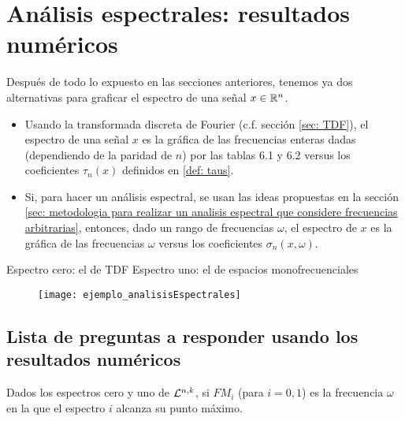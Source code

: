 \chapter{Análisis espectrales: resultados numéricos}
\label{chap: resultados numericos analisis espectrales}

Después de todo lo expuesto en las secciones anteriores, tenemos
ya dos alternativas para graficar el espectro
de una señal $x \in \mathbb{R}^{n}$.

\begin{itemize}
	\item Usando la transformada discreta de Fourier
	(c.f. sección \ref{sec: TDF}), el espectro de
	una señal $x$ es la gráfica de las frecuencias
	enteras dadas (dependiendo de la 
	paridad de $n$) por las
	tablas 6.1 y 6.2
	versus los coeficientes
	$\tau_{n}(x)$ definidos en
	\ref{def: taus}.
	
	\item Si, para hacer un análisis espectral, se usan
	las ideas propuestas en 
	la sección
	\ref{sec: metodologia para realizar un analisis espectral que considere frecuencias arbitrarias}, entonces, dado un rango de frecuencias 
	$\omega$,
	el espectro de $x$ es la gráfica de 
	las frecuencias $\omega$ versus	
	los coeficientes
	$\sigma_{n}(x, \omega)$.
	

\end{itemize}

Espectro cero: el de TDF
Espectro uno: el de espacios monofrecuenciales

\begin{figure}[H]
	\centering
	\texttt{[image: ejemplo\_analisisEspectrales]} 
\end{figure}	

\section{Lista de preguntas a responder usando los resultados numéricos}

\begin{notacion}
Dados los espectros cero y uno de $\mathcal{L}^{n,k}$, si
$FM_{i}$ 
(para $i=0,1$)
es la frecuencia $\omega$ en la que el espectro 
$i$ alcanza su punto máximo.
\end{notacion}


